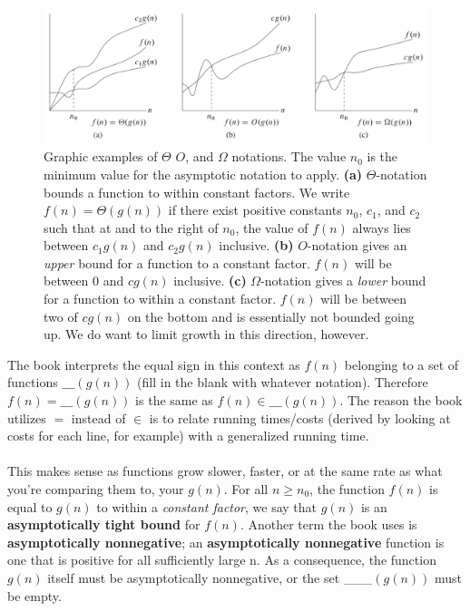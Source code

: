 \documentclass{article}
\begin{document}
\begin{figure}[ht]
\centering
\includegraphics[scale=0.35]{asymptotic_notation}
\caption{
Graphic examples of $\Theta$ $O$, and $\Omega$ notations. The value $n_0$ is the minimum value for the asymptotic notation to apply.
\textbf{(a)} $\Theta$-notation bounds a function to within constant factors. We write $f(n)=\Theta{(g(n))}$ if there exist positive constants $n_0$, $c_1$, and $c_2$ such that at and to the right of $n_0$, the value of $f(n)$ always lies between $c_1g(n)$ and $c_2g(n)$ inclusive.
\textbf{(b)} $O$-notation gives an \textit{upper} bound for a function to a constant factor. $f(n)$ will be between 0 and $cg(n)$ inclusive.
\textbf{(c)} $\Omega$-notation gives a \textit{lower} bound for a function to within a constant factor. $f(n)$ will be between two of $cg(n)$ on the bottom and is essentially not bounded going up. We do want to limit growth in this direction, however.
}
\label{fig:asymptotic_notation}
\end{figure}
\newpage
The book interprets the equal sign in this context as $f(n)$ belonging to a set of functions $\_\_\_(g(n))$ (fill in the blank with whatever notation). Therefore $f(n)=\_\_\_(g(n))$ is the same as $f(n) \in \_\_\_(g(n))$. The reason the book utilizes $=$ instead of $\in$ is to relate running times/costs (derived by looking at costs for each line, for example) with a generalized running time.
\\ \\
This makes sense as functions grow slower, faster, or at the same rate as what you're comparing them to, your $g(n)$. For all $n \geq n_0$, the function $f(n)$ is equal to $g(n)$ to within a \textit{constant factor}, we say that $g(n)$ is an \textbf{asymptotically tight bound} for $f(n)$. Another term the book uses is \textbf{asymptotically nonnegative}; an \textbf{asymptotically nonnegative} function is one that is positive for all sufficiently large n. As a consequence, the function $g(n)$ itself must be asymptotically nonnegative, or the set \_\_\_$(g(n))$ must be empty. 
\end{document}
